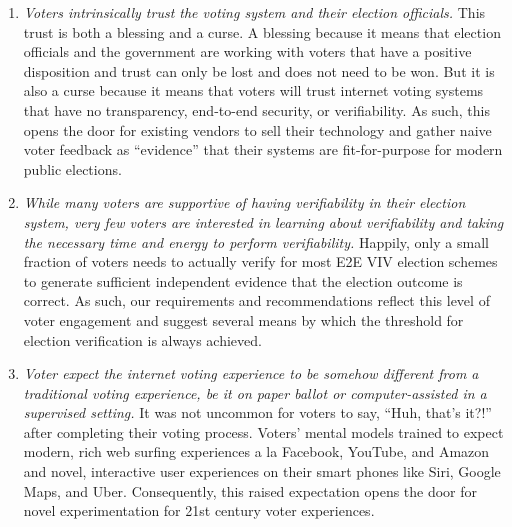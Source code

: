 \begin{enumerate}
\item \emph{Voters intrinsically trust the voting system and their
    election officials.}  This trust is both a blessing and a curse.
  A blessing because it means that election officials and the
  government are working with voters that have a positive disposition
  and trust can only be lost and does not need to be won. But it is
  also a curse because it means that voters will trust internet voting
  systems that have no transparency, end-to-end security, or
  verifiability. As such, this opens the door for existing vendors to
  sell their technology and gather naive voter feedback as
  ``evidence'' that their systems are fit-for-purpose for modern
  public elections.
\item \emph{While many voters are supportive of having verifiability
    in their election system, very few voters are interested in
    learning about verifiability and taking the necessary time and
    energy to perform verifiability.} Happily, only a small fraction
  of voters needs to actually verify for most E2E VIV election schemes
  to generate sufficient independent evidence that the election outcome
  is correct. As such, our requirements and recommendations reflect
  this level of voter engagement and suggest several means by which
  the threshold for election verification is always achieved.
\item \emph{Voter expect the internet voting experience to be somehow
    different from a traditional voting experience, be it on paper
    ballot or computer-assisted in a supervised setting.} It was not
  uncommon for voters to say, ``Huh, that's it?!'' after completing
  their voting process. Voters' mental models trained to expect
  modern, rich web surfing experiences a la Facebook, YouTube, and
  Amazon and novel, interactive user experiences on their smart phones
  like Siri, Google Maps, and Uber. Consequently, this raised
  expectation opens the door for novel experimentation for 21st
  century voter experiences.
\end{enumerate}

